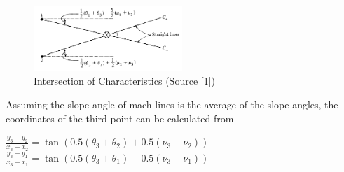 \begin{figure}[H]
    \centering
    \includegraphics[width=0.5\textwidth]{text/intersection_characterisitcs.PNG}
    \caption[Intersection of Characteristics]{Intersection of Characteristics (Source [1])}
    \label{fig:Intersection of Characteristics}
\end{figure}    
Assuming the slope angle of mach lines is the average of the slope angles, the coordinates of the third point can be calculated from\\
\begin{center}
    $\frac{y_3 - y_2}{x_3 - x_2} = \tan(0.5(\theta_3 + \theta_2) + 0.5(\nu_3 + \nu_2) )  $\\
    $\frac{y_3 - y_1}{x_3 - x_1} = \tan(0.5(\theta_3 + \theta_1) - 0.5(\nu_3 + \nu_1) )  $\\
\end{center}
